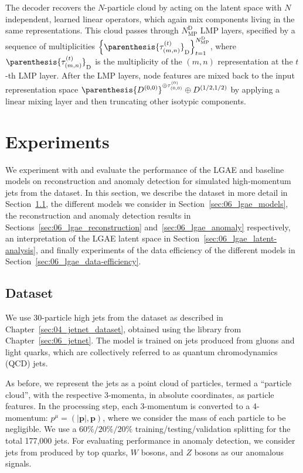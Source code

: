 The decoder recovers the $N$-particle cloud by acting on the latent space with $N$ independent, learned linear operators, which again mix components living in the same representations.
This cloud passes through $N_{\mathrm{MP}}^{\mathrm{D}}$ LMP layers, specified by a sequence of multiplicities $\left\{ \parenthesis{\tau_{(m, n)}^{(t)}}_{\mathrm{D}} \right\}_{t=1}^{N_{\mathrm{MP}}^{\mathrm{D}}}$, where $\parenthesis{\tau_{(m, n)}^{(t)}}_{\mathrm{D}}$ is the multiplicity of the $(m, n)$ representation at the $t$-th LMP layer.
After the LMP layers, node features are mixed back to the input representation space $\parenthesis{D^{(0,0)}}^{\oplus \tau_{(0,0)}^{(0)}} \oplus D^{(1/2, 1/2)}$ by applying a linear mixing layer and then truncating other isotypic components.

\section{Experiments}
\label{sec:06_lgae_experiments}

We experiment with and evaluate the performance of the LGAE and baseline models on reconstruction and anomaly detection for simulated high-momentum jets from the \jetnet dataset.
In this section, we describe the dataset in more detail in Section~\ref{sec:06_lgae_dataset}, the different models we consider in Section~\ref{sec:06_lgae_models}, the reconstruction and anomaly detection results in Sections~\ref{sec:06_lgae_reconstruction} and~\ref{sec:06_lgae_anomaly} respectively, an interpretation of the LGAE latent space in Section~\ref{sec:06_lgae_latent-analysis}, and finally experiments of the data efficiency of the different models in Section~\ref{sec:06_lgae_data-efficiency}.

\subsection{Dataset}
\label{sec:06_lgae_dataset}

We use 30-particle high \pt jets from the \jetnet dataset as described in Chapter~\ref{sec:04_jetnet_dataset}, obtained using the \jetnet library from Chapter~\ref{sec:06_jetnet}.
The model is trained on jets produced from gluons and light quarks, which are collectively referred to as quantum chromodynamics (QCD) jets.

As before, we represent the jets as a point cloud of particles, termed a ``particle cloud'', with the respective 3-momenta, in absolute coordinates, as particle features.
In the processing step, each 3-momentum is converted to a 4-momentum: $p^\mu = (|\mathbf{p}|, \mathbf{p})$, where we consider the mass of each particle to be negligible.
We use a $60\%/20\%/20\%$ training/testing/validation splitting for the total 177,000 jets.
For evaluating performance in anomaly detection, we consider jets from \jetnet produced by top quarks, $W$ bosons, and $Z$ bosons as our anomalous signals.


